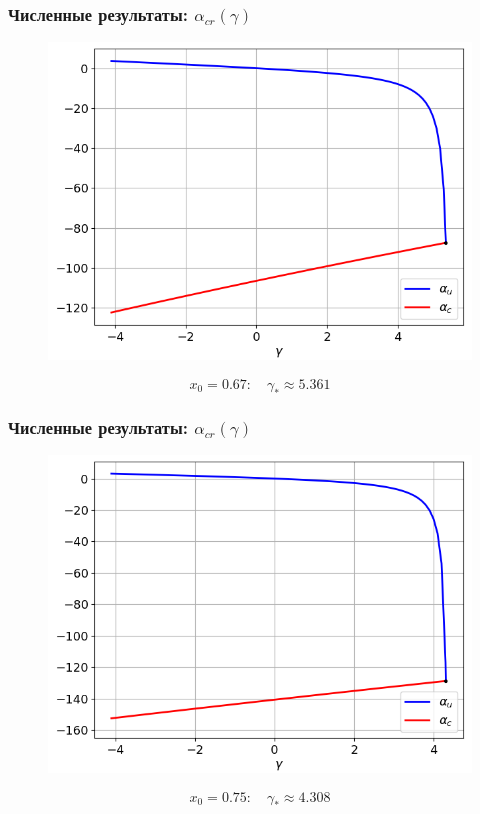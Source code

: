 \documentclass[fullscreen=true, unicode, bookmarks=false]{beamer}
\begin{document}
\begin{frame}
\frametitle{ Численные результаты: $ \alpha_{cr}(\gamma) $ }

\begin{figure} 
\includegraphics[scale=0.55]{alphas_23.png}  
\end{figure}

$$ x_0 = 0.67: \quad \gamma_* \approx 5.361 $$

\end{frame}

\begin{frame}
\frametitle{ Численные результаты: $ \alpha_{cr}(\gamma) $ }

\begin{figure} 
\includegraphics[scale=0.55]{alphas_34.png}  
\end{figure}

$$ x_0 = 0.75: \quad \gamma_* \approx 4.308 $$

\end{frame}
\end{document}
